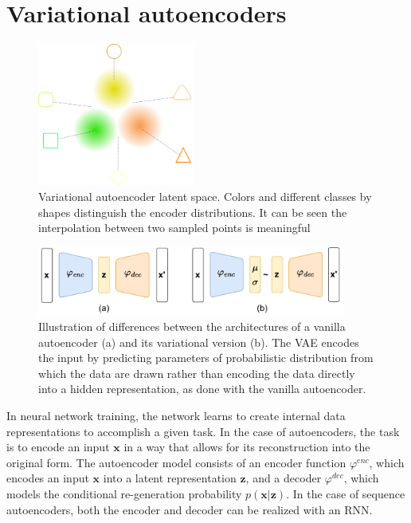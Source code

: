 \section{Variational autoencoders}
\label{02:sec:vae}
\begin{figure}[t]
    \centering
    \includegraphics[width=0.46\textwidth]{images/VAE.png}
    \caption{Variational autoencoder latent space. Colors and different classes by shapes distinguish the encoder distributions. It can be seen the interpolation between two sampled points is meaningful}
    \label{fig:vae}
\end{figure}
\begin{figure}[t]
    \centering
    \includegraphics[width=0.9\textwidth]{images/enc-dec.pdf}
    \caption{Illustration of differences between the architectures of a vanilla autoencoder (a) and its variational version (b). The VAE encodes the input by predicting parameters of probabilistic distribution from which the data are drawn rather than encoding the data directly into a hidden representation, as done with the vanilla autoencoder.}
    \label{fig:vae-vs-ae}
\end{figure}
In neural network training, the network learns to create internal data representations to accomplish a given task.
In the case of autoencoders, the task is to encode an input $\mathbf{x}$ in a way that allows for its reconstruction into the original form.
The autoencoder model consists of an encoder function $\varphi^{enc}$, which encodes an input $\mathbf{x}$ into a latent representation $\mathbf{z}$, and a decoder $\varphi^{dec}$, which models the conditional re-generation probability $p(\mathbf{x}|\mathbf{z})$.
In the case of sequence autoencoders, both the encoder and decoder can be realized with an RNN.
